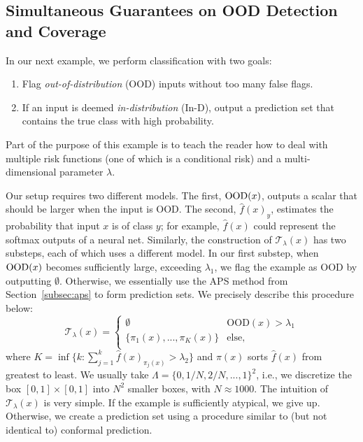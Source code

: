 \documentclass[10pt]{article}
\newcommand{\T}{\mathcal{T}}
\newcommand{\Tlam}{\mathcal{T}_{\lambda}}
\begin{document}
\subsection{Simultaneous Guarantees on OOD Detection and Coverage}
\label{app:ltt-ood}

In our next example, we perform classification with two goals:
\begin{enumerate}
    \item Flag \emph{out-of-distribution} (OOD) inputs without too many false flags.
    \item If an input is deemed \emph{in-distribution} (In-D), output a prediction set that contains the true class with high probability.
\end{enumerate}
Part of the purpose of this example is to teach the reader how to deal with multiple risk functions (one of which is a conditional risk) and a multi-dimensional parameter $\lambda$.

Our setup requires two different models.
The first, ${\rm OOD}(x)$, outputs a scalar that should be larger when the input is OOD.
The second, $\hat{f}(x)_y$, estimates the probability that input $x$ is of class $y$; for example, $\hat{f}(x)$ could represent the softmax outputs of a neural net.
Similarly, the construction of $\Tlam(x)$ has two substeps, each of which uses a different model.
In our first substep, when ${\rm OOD}(x)$ becomes sufficiently large, exceeding $\lambda_1$, we flag the example as OOD by outputting $\emptyset$.
Otherwise, we essentially use the APS method from Section~\ref{subsec:aps} to form prediction sets.
We precisely describe this procedure below:
\begin{equation}
    \T_{\lambda}(x) = \begin{cases}
      \emptyset & \mathrm{OOD}(x) > \lambda_1 \\
      \{\pi_1(x),...,\pi_K(x)\} & \text{else},  \\
    \end{cases} 
\end{equation}
where $K=\inf\{ k : \sum\limits_{j=1}^k\hat{f}(x)_{\pi_j(x)} > \lambda_2\}$ and $\pi(x)$ sorts $\hat{f}(x)$ from greatest to least.
We usually take $\Lambda = \{0,1/N,2/N, ..., 1\}^2$, i.e., we discretize the box $[0,1]\times[0,1]$ into $N^2$ smaller boxes, with $N\approx 1000$.
The intuition of $\T_{\lambda}(x)$ is very simple.
If the example is sufficiently atypical, we give up. 
Otherwise, we create a prediction set using a procedure similar to (but not identical to) conformal prediction.
\end{document}
